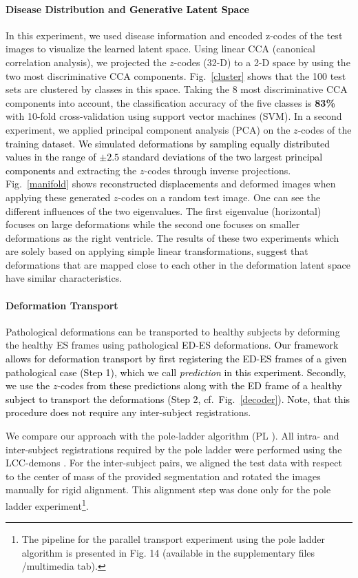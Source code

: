 \documentclass[journal]{IEEEtran}
\newcommand{\update}[1]{\textcolor{black}{#1}}
\begin{document}
\paragraph{Disease Distribution and \update{Generative Latent Space}} In this experiment, we used disease information and encoded z-codes of the test images to visualize \update{the} learned latent space. Using linear CCA (canonical correlation analysis), we projected the $z$-codes (32-D) to a 2-D space by using the two most discriminative CCA components. Fig.~\ref{cluster} shows that the 100 test sets are clustered by classes in this space. Taking the 8 most discriminative CCA components into account, the classification accuracy of the five classes is \textbf{83\%} with 10-fold cross-validation using support vector machines (SVM). 
In a second experiment, we applied principal component analysis (PCA) on the $z$-codes of the \update{training dataset. We simulated deformations by sampling equally distributed values in the range of $\pm2.5$ standard deviations of the two largest principal components} and extracting the $z$-codes through inverse projections. Fig.~\ref{manifold} shows \update{reconstructed displacements} and deformed images when applying these \update{generated} $z$-codes on a random test image. One can see the different influences of the two eigenvalues. The first eigenvalue (horizontal) focuses on large deformations while the second one focuses on smaller deformations as the right ventricle. The results of these two experiments which are solely based on applying simple linear transformations, suggest that deformations that are mapped close to each other in the deformation latent space have similar characteristics.

\paragraph{Deformation Transport}
Pathological deformations can be transported to healthy subjects by deforming the healthy ES frames using pathological ED-ES deformations\update{. Our framework allows for deformation transport by first registering the ED-ES frames of a given pathological case (Step 1), which we call \emph{prediction} in this experiment. Secondly, we use the $z$-codes from these predictions along with the ED frame of a healthy subject to transport the deformations (Step 2, cf.\ Fig.~\ref{decoder}). Note, that this procedure does not require} any inter-subject registrations. 

We compare our approach with the pole-ladder algorithm (PL \cite{lorenzi2014efficient}). All intra- and inter-subject registrations required by the pole ladder were performed using the LCC-demons \cite{lorenzi2013lcc}. For the inter-subject pairs, we aligned the test data with respect to the center of mass of the provided segmentation and rotated the images manually for rigid alignment. This alignment step was done only for the pole ladder experiment\update{\footnote{The pipeline for the parallel transport experiment using the pole ladder algorithm is presented in Fig. 14 (available in the supplementary files /multimedia tab).}}. 
\end{document}
